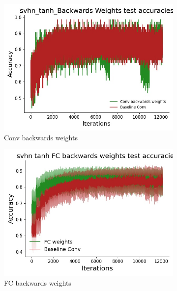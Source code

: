  \begin{figure}[htb]
    \centering %
\begin{subfigure}{0.25\textwidth}
  \includegraphics[width=\linewidth]{chapter_6_figures/AR/svhn_tanh_Backwards_Weights_test_accuracies_prelim_1.jpg}
  \caption{Conv backwards weights}
\end{subfigure}\hfil %
\begin{subfigure}{0.25\textwidth}
  \includegraphics[width=\linewidth]{chapter_6_figures/AR/svhn_tanh_FC_backwards_weights_test_accuracies_prelim_1.jpg}
  \caption{FC backwards weights}
\end{subfigure}\hfil %
\begin{subfigure}{0.25\textwidth}

\end{subfigure}
\end{figure}
